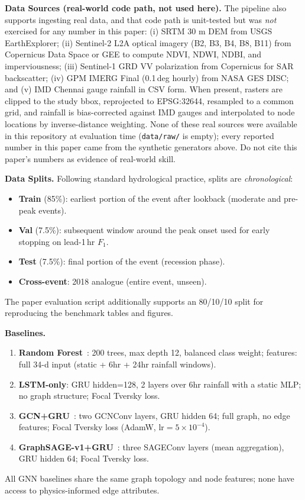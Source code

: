 \documentclass[10pt,twocolumn]{article}
\begin{document}
\smallskip\noindent\textbf{Data Sources (real-world code path, not used here).}
The pipeline also supports ingesting real data, and that code path is
unit-tested but was \emph{not} exercised for any number in this paper:
(i) SRTM 30 m DEM from USGS EarthExplorer; (ii) Sentinel-2 L2A optical
imagery (B2, B3, B4, B8, B11) from Copernicus Data Space or GEE to compute
NDVI, NDWI, NDBI, and imperviousness; (iii) Sentinel-1 GRD VV polarization
from Copernicus for SAR backscatter; (iv) GPM IMERG Final (0.1\,deg hourly)
from NASA GES DISC; and (v) IMD Chennai gauge rainfall in CSV form. When
present, rasters are clipped to the study bbox, reprojected to EPSG:32644,
resampled to a common grid, and rainfall is bias-corrected against IMD
gauges and interpolated to node locations by inverse-distance weighting.
None of these real sources were available in this repository at evaluation
time (\texttt{data/raw/} is empty); every reported number in this paper came
from the synthetic generators above. Do not cite this paper's numbers as
evidence of real-world skill.

\smallskip\noindent\textbf{Data Splits.}
Following standard hydrological practice, splits are \emph{chronological}:
\begin{itemize}[leftmargin=*,itemsep=1pt,topsep=2pt]
    \item \textbf{Train} (85\%): earliest portion of the event after lookback
      (moderate and pre-peak events).
    \item \textbf{Val} (7.5\%): subsequent window around the peak onset used
      for early stopping on lead-1\,hr $F_1$.
    \item \textbf{Test} (7.5\%): final portion of the event (recession phase).
    \item \textbf{Cross-event}: 2018 analogue (entire event, unseen).
\end{itemize}
The paper evaluation script additionally supports an 80/10/10 split for
reproducing the benchmark tables and figures.

\smallskip\noindent\textbf{Baselines.}
\begin{enumerate}[leftmargin=*,itemsep=1pt,topsep=2pt]
    \item \textbf{Random Forest}~\cite{breiman2001}: 200 trees, max depth
      12, balanced class weight; features: full 34-d input
      (static + 6hr + 24hr rainfall windows).
    \item \textbf{LSTM-only}: GRU hidden=128, 2 layers over 6hr rainfall with
      a static MLP; no graph structure; Focal Tversky loss.
    \item \textbf{GCN+GRU}~\cite{kipf2017}: two GCNConv layers, GRU hidden
      64; full graph, no edge features; Focal Tversky loss (AdamW, lr$=5\times10^{-4}$).
    \item \textbf{GraphSAGE-v1+GRU}~\cite{hamilton2017}: three SAGEConv
      layers (mean aggregation), GRU hidden 64; Focal Tversky loss.
\end{enumerate}
All GNN baselines share the same graph topology and node features; none
have access to physics-informed edge attributes.
\end{document}
